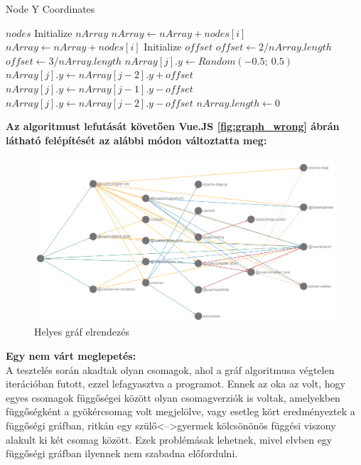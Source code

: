 \begin{algorithm}
	\caption{Node Y Coordinates}
	\begin{algorithmic}	
		\Require $nodes$
		\State Initialize $nArray$
				\State $nArray \gets nArray + nodes[i]$
				\State $nArray \gets nArray + nodes[i]$
				\State Initialize $offset$
					\State $offset \gets 2/nArray.length$
				\Else
					\State $offset \gets 3/nArray.length$
				\EndIf
						\State $nArray[j].y \gets Random(-0.5;\ 0.5)$
					\Else
						\State $nArray[j].y \gets nArray[j-2].y+offset$
						\Else
						\State $nArray[j].y \gets nArray[j-1].y-offset$
						\Else
						\State $nArray[j].y \gets nArray[j-2].y-offset$
						\EndIf
						\EndIf
					\EndIf
				\EndFor
				\State $nArray.length \gets 0$
			\EndIf
		\EndFor
	\end{algorithmic}
\end{algorithm}

\pagebreak

\noindent\textbf{Az algoritmust lefutását követően Vue.JS \ref{fig:graph_wrong} ábrán látható felépítését az alábbi módon változtatta meg:}

\begin{figure}[!h]
	\centering
	\includegraphics[scale=0.4]{images/graph_right.png}
	\caption{Helyes gráf elrendezés}
	\label{fig:graph_right}
\end{figure}

\noindent\textbf{Egy nem várt meglepetés:}\\

A tesztelés során akadtak olyan csomagok, ahol a gráf algoritmusa végtelen iterációban futott, ezzel lefagyasztva a programot.
Ennek az oka az volt, hogy egyes csomagok függőségei között olyan csomagverziók is voltak, amelyekben függőségként a gyökércsomag volt megjelölve, vagy esetleg kört eredményeztek a függőségi gráfban, ritkán egy szülő<-->gyermek kölcsönönös függési viszony alakult ki két csomag között. Ezek problémásak lehetnek, mivel elvben egy függőségi gráfban ilyennek nem szabadna előfordulni.

